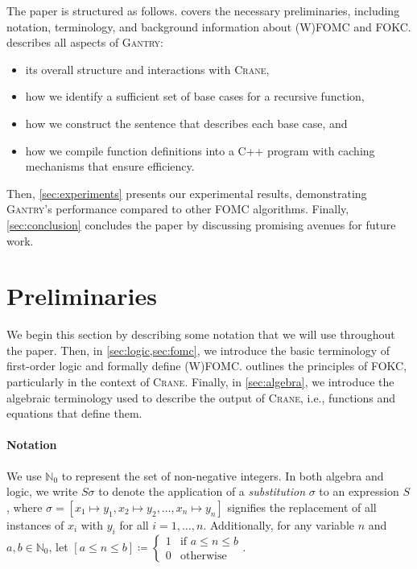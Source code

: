 \documentclass[a4paper,UKenglish,cleveref,autoref,thm-restate]{lipics-v2021}
\newcommand{\Cranetwo}{\textsc{Gantry}}
\begin{document}
The paper is structured as follows.  covers the
necessary preliminaries, including notation, terminology, and background
information about (W)FOMC and FOKC\@.  describes all aspects of
\Cranetwo{}:
\begin{itemize}
  \item its overall structure and interactions with \textsc{Crane},
  \item how we identify a sufficient set of base cases for a recursive function,
  \item how we construct the sentence that describes each base case, and
  \item how we compile function definitions into a C++ program with caching
        mechanisms that ensure efficiency.
\end{itemize}
Then, \cref{sec:experiments} presents our experimental results, demonstrating
\Cranetwo{}'s performance compared to other FOMC algorithms. Finally,
\cref{sec:conclusion} concludes the paper by discussing promising avenues for
future work.

\section{Preliminaries}\label{sec:preliminaries}

We begin this section by describing some notation that we will use throughout
the paper. Then, in \cref{sec:logic,sec:fomc}, we introduce the basic
terminology of first-order logic and formally define (W)FOMC\@. 
outlines the principles of FOKC, particularly in the context of \textsc{Crane}.
Finally, in \cref{sec:algebra}, we introduce the algebraic terminology used to
describe the output of \textsc{Crane}, i.e., functions and equations that define
them.

\paragraph*{Notation}
We use $\mathbb{N}_{0}$ to represent the set of non-negative integers. In both
algebra and logic, we write $S\sigma$ to denote the application of a
\emph{substitution} $\sigma$ to an expression $S$, where
$\sigma = [x_{1} \mapsto y_{1}, x_{2} \mapsto y_{2}, \dots, x_{n} \mapsto y_{n}]$
signifies the replacement of all instances of $x_{i}$ with $y_{i}$ for all
$i = 1, \dots, n$. Additionally, for any variable $n$ and
$a, b \in \mathbb{N}_{0}$, let $[a \le n \le b] \coloneqq \begin{cases}
  1 & \text{if $a \le n \le b$} \\
  0 & \text{otherwise}
\end{cases}$.
\end{document}
